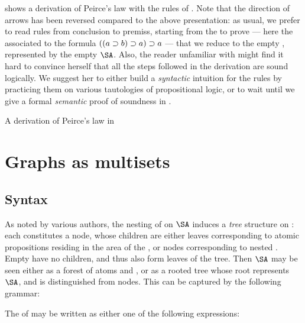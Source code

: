 \begin{scope}
 shows a derivation of Peirce's law with the rules of
. Note that the direction of arrows has been reversed compared to the
above presentation: as usual, we prefer to read rules from conclusion to
premiss, starting from the  to prove --- here the  associated to the
formula $((a \limp b) \limp a) \limp a$ --- that we reduce to the empty ,
represented by the empty $\SA$. Also, the reader unfamiliar with  might find
it hard to convince herself that all the steps followed in the derivation are
sound logically. We suggest her to either build a \emph{syntactic} intuition for
the rules by practicing them on various tautologies of propositional logic, or
to wait until we give a formal \emph{semantic} proof of soundness in
.

\begin{marginfigure}
  
  \caption{A derivation of Peirce's law in }
\end{marginfigure}


\section{Graphs as multisets}

\subsection{Syntax}

As noted by various authors, the nesting of  on $\SA$
induces a \emph{tree} structure on : each  constitutes a
node, whose children are either leaves corresponding to atomic propositions
residing in the area of the , or nodes corresponding to nested
. Empty  have no children, and thus also form leaves of the
tree. Then $\SA$ may be seen either as a forest of atoms and , or as a
rooted tree whose root represents $\SA$, and is distinguished from 
nodes. This can be captured by the following grammar:

\begin{example}
The  of  may be written as either one of the
following expressions:
\begin{mathpar}


\end{mathpar}
\end{example}
\end{scope}

